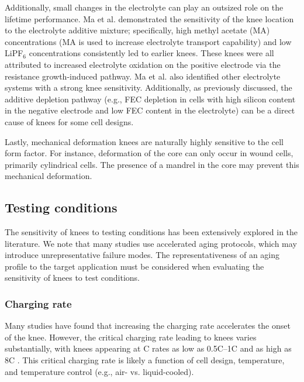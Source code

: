 \documentclass[journal=jpclcd,manuscript=article]{achemso}
\begin{document}
Additionally, small changes in the electrolyte can play an outsized role on the lifetime performance. Ma et al.\cite{ma_editors_2019} demonstrated the sensitivity of the knee location to the electrolyte additive mixture; specifically, high methyl acetate (MA) concentrations (MA is used to increase electrolyte transport capability) and low LiPF$_6$ concentrations consistently led to earlier knees. These knees were all attributed to increased electrolyte oxidation on the positive electrode via the resistance growth-induced pathway. Ma et al.\cite{ma_editors_2019} also identified other electrolyte systems with a strong knee sensitivity. Additionally, as previously discussed, the additive depletion pathway (e.g., FEC depletion in cells with high silicon content in the negative electrode and low FEC content in the electrolyte) can be a direct cause of knees for some cell designs.\cite{petibon_studies_2016, jung_consumption_2016}

Lastly, mechanical deformation knees are naturally highly sensitive to the cell form factor. For instance, deformation of the core \cite{pfrang_long-term_2018,carter_mechanical_2019,willenberg_development_2020} can only occur in wound cells, primarily cylindrical cells. The presence of a mandrel in the core may prevent this mechanical deformation.\cite{carter_mechanical_2019}

\subsection{Testing conditions}

The sensitivity of knees to testing conditions has been extensively explored in the literature.
We note that many studies use accelerated aging protocols, which may introduce unrepresentative failure modes.
The representativeness of an aging profile to the target application must be considered when evaluating the sensitivity of knees to test conditions.

\subsubsection{Charging rate}
Many studies have found that increasing the charging rate accelerates the onset of the knee.\cite{lewerenz_systematic_2017,lewerenz_post-mortem_2017, petzl_lithium_2015, burns_-situ_2015, waldmann_optimization_2015, schuster_nonlinear_2015, severson_data-driven_2019, schindler_fast_2018, keil_linear_2019} However, the critical charging rate leading to knees varies substantially, with knees appearing at C rates as low as 0.5C--1C \cite{waldmann_optimization_2015, willenberg_development_2020} and as high as 8C \cite{lewerenz_systematic_2017}. This critical charging rate is likely a function of cell design, temperature, and temperature control (e.g., air- vs. liquid-cooled).
\end{document}
